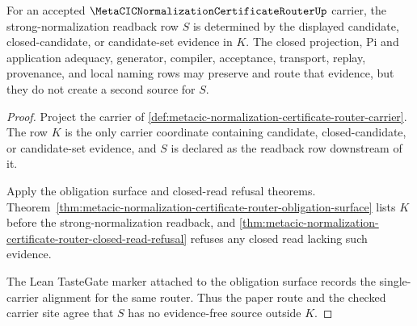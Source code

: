 \begin{theorem}
\label{thm:metacic-normalization-certificate-router-candidate-determinacy}
For an accepted $\MetaCICNormalizationCertificateRouterUp$ carrier, the strong-normalization readback row $S$ is determined by the displayed candidate, closed-candidate, or candidate-set evidence in $K$. The closed projection, Pi and application adequacy, generator, compiler, acceptance, transport, replay, provenance, and local naming rows may preserve and route that evidence, but they do not create a second source for $S$.
\end{theorem}
\begin{proof}
Project the carrier of \autoref{def:metacic-normalization-certificate-router-carrier}. The row $K$ is the only carrier coordinate containing candidate, closed-candidate, or candidate-set evidence, and $S$ is declared as the readback row downstream of it.

Apply the obligation surface and closed-read refusal theorems. Theorem~\ref{thm:metacic-normalization-certificate-router-obligation-surface} lists $K$ before the strong-normalization readback, and \autoref{thm:metacic-normalization-certificate-router-closed-read-refusal} refuses any closed read lacking such evidence.

The Lean TasteGate marker attached to the obligation surface records the single-carrier alignment for the same router. Thus the paper route and the checked carrier site agree that $S$ has no evidence-free source outside $K$.
\end{proof}

